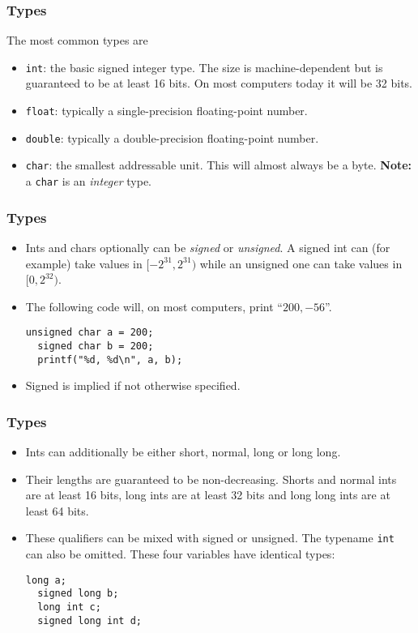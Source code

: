 \begin{frame}
  \frametitle{Types}
  The most common types are
  \begin{itemize}
  \item \texttt{int}: the basic signed integer type. The size is
    machine-dependent but is guaranteed to be at least 16 bits. On most
    computers today it will be 32 bits.
  \item \texttt{float}: typically a single-precision floating-point number.
  \item \texttt{double}: typically a double-precision floating-point number.
  \item \texttt{char}: the smallest addressable unit. This will almost always be
    a byte. \textbf{Note:} a \texttt{char} is an \emph{integer} type.
  \end{itemize}
\end{frame}

\begin{frame}[fragile]
  \frametitle{Types}
  \begin{itemize}
  \item Ints and chars optionally can be \emph{signed} or \emph{unsigned}. A
    signed int can (for example) take values in $[-2^{31}, 2^{31})$ while an
    unsigned one can take values in $[0,2^{32})$.
  \item The following code will, on most computers, print ``$200, -56$''.
\begin{lstlisting}[style=c]
  unsigned char a = 200;
  signed char b = 200;
  printf("%d, %d\n", a, b);
\end{lstlisting}
  \item Signed is implied if not otherwise specified.
  \end{itemize}
\end{frame}

\begin{frame}[fragile]
  \frametitle{Types}
  \begin{itemize}
  \item Ints can additionally be either short, normal, long or long long.
  \item Their lengths are guaranteed to be non-decreasing. Shorts and normal
    ints are at least 16 bits, long ints are at least 32 bits and long long ints
    are at least 64 bits.
  \item These qualifiers can be mixed with signed or unsigned. The typename
    \texttt{int} can also be omitted. These four variables have identical types:
\begin{lstlisting}[style=c]
  long a;
  signed long b;
  long int c;
  signed long int d;
\end{lstlisting}
  \end{itemize}
\end{frame}

